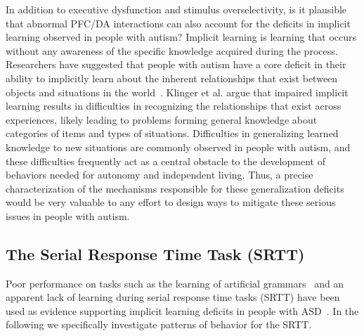 \documentclass[man]{apa}
\begin{document}
In addition to executive dysfunction and stimulus overselectivity, is it plausible that abnormal PFC/DA interactions can also account for the deficits in implicit learning observed in people with autism?  Implicit learning is learning that occurs without any awareness of the specific knowledge acquired during the process.  Researchers have suggested that people with autism have a core deficit in their ability to implicitly learn about the inherent relationships that exist between objects and situations in the world~\cite{RefWorks:148,RefWorks:149}.  Klinger et al. argue that impaired implicit learning results in difficulties in recognizing the relationships that exist across experiences, likely leading to problems forming general knowledge about categories of items and types of situations.  Difficulties in generalizing learned knowledge to new situations are commonly observed in people with autism, and these difficulties frequently act as a central obstacle to the development of behaviors needed for autonomy and independent living.  Thus, a precise characterization of the mechanisms responsible for these generalization deficits would be very valuable to any effort to design ways to mitigate these serious issues in people with autism.

\subsection{The Serial Response Time Task (SRTT)}

Poor performance on tasks such as the learning of artificial grammars~\cite{RefWorks:147} and an apparent lack of learning during serial response time tasks (SRTT) have been used as evidence supporting implicit learning deficits in people with ASD~\cite{RefWorks:148,RefWorks:149}.  In the following we specifically investigate patterns of behavior for the SRTT.
\end{document}
